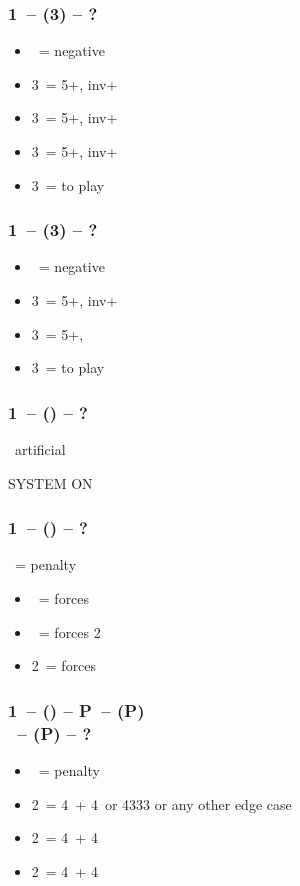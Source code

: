 \subsubsection*{1\ntx\ -- (3\clubs) -- ?}
\begin{itemize}
    \item \dbl\ = negative
    \item 3\diams\ = 5+\hearts, inv+
    \item 3\hearts\ = 5+\spades, inv+
    \item 3\spades\ = 5+\diams, inv+
    \item 3\nt\ = to play
\end{itemize}

\subsubsection*{1\ntx\ -- (3\diams) -- ?}
\begin{itemize}
    \item \dbl\ = negative
    \item 3\hearts\ = 5+\spades, inv+
    \item 3\spades\ = 5+\hearts, \gf
    \item 3\nt\ = to play
\end{itemize}

\subsubsection*{1\ntx\ -- (\dbl\alrts) -- ?}
\dbl\ artificial

SYSTEM ON


\subsubsection*{1\ntx\ -- (\dbl) -- ?}
\dbl\ = penalty
\begin{itemize}
    \item \pass\ = forces \rdbl
    \item \rdbl\ = forces 2\clubs
    \item 2\ = forces 
\end{itemize}

\subsubsection*{1\ntx\ -- (\dbl) -- P\alrts\ -- (P)\\
                \rdbl\ -- (P) -- ?}
\begin{itemize}
    \item \pass\ = penalty
    \item 2\clubs\ = 4\clubs\ + 4\ or 4333 or any other edge case
    \item 2\diams\ = 4\diams\ + 4\major
    \item 2\hearts\ = 4\hearts\ + 4\spades
\end{itemize}

